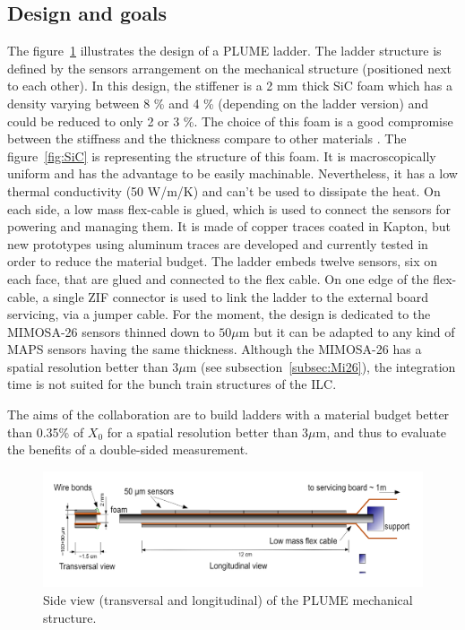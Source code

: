     \subsection{Design and goals}

    The figure~\ref{fig:PLUME} illustrates the design of a PLUME ladder.
    The ladder structure is defined by the sensors arrangement on the mechanical structure (positioned next to each other).
    In this design, the stiffener is a 2 mm thick \gls{SiC} foam which has a density varying between 8 \% and 4 \% (depending on the ladder version) and could be reduced to only 2 or 3 \%.
    The choice of this foam is a good compromise between the stiffness and the thickness compare to other materials \cite{LectureJoel}.
    The figure~\ref{fig:SiC} is representing the structure of this foam.
    It is macroscopically uniform and has the advantage to be easily machinable.
    Nevertheless, it has a low thermal conductivity (50 W/m/K) and can't be used to dissipate the heat.
    On each side, a low mass flex-cable is glued, which is used to connect the sensors for powering and managing them.
    It is made of copper traces coated in Kapton, but new prototypes using aluminum traces are developed and currently tested in order to reduce the material budget.
    The ladder embeds twelve sensors, six on each face, that are glued and connected to the flex cable.
    On one edge of the flex-cable, a single \gls{ZIF} connector is used to link the ladder to the external board servicing, via a jumper cable.
    For the moment, the design is dedicated to the MIMOSA-26 sensors thinned down to $50 \mu\text{m}$ but it can be adapted to any kind of \gls{MAPS} sensors having the same thickness. 
    Although the MIMOSA-26 has a spatial resolution better than 3$\mu$m (see subsection~\ref{subsec:Mi26}), the integration time is not suited for the bunch train structures of the \gls{ILC}.

    The aims of the collaboration are to build ladders with a material budget better than 0.35\% of $X_0$ for a spatial resolution better than 3$\mu$m, and thus to evaluate the benefits of a double-sided measurement.

    \begin{figure}[!h]
      \centering
      \includegraphics[width = 15 cm]{Pictures/vxd/plume_finalGoal.png}
      \caption{Side view (transversal and longitudinal) of the PLUME mechanical structure.}
      \label{fig:PLUME}
    \end{figure}


